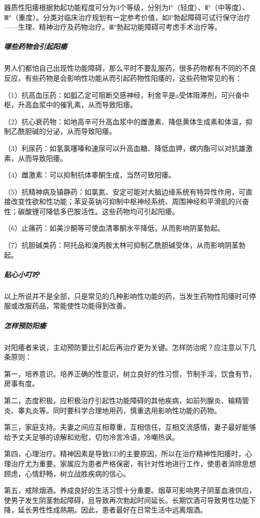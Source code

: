 \begin{enumerate}
器质性阳痿根据勃起功能程度可分为3个等级，分别为Ⅰ°（轻度）、Ⅱ°（中等度）、Ⅲ°（重度）。分类对临床治疗规划有一定参考价值，如Ⅰ°勃起障碍可试行保守治疗——生理、精神治疗及药物治疗。Ⅲ°勃起功能障碍可考虑手术治疗等。

\subparagraph{哪些药物会引起阳痿}

男人们都怕自己出现性功能障碍，那么平时不要乱服药，很多药物都有不同的不良反应，有些药物是会影响性功能从而引起药物性阳痿的，这些药物常见的有：

（1）抗高血压药：如胍乙定可阻断交感神经，利舍平是a受体阻滞剂，可兴奋中枢，升高血浆中的催乳素，从而导致阳痿。

（2）抗心衰药物：如地高辛可升高血浆中的雌激素、降低黄体生成素和体温，抑制乙酰胆碱的分泌，从而导致阳痿。

（3）利尿药：如氢氯噻嗪和速尿可以升高血糖、降低血钾，螺内酯可以对抗雄激素，从而导致阳痿。

（4）雌激素：可以抑制抗体睾酮生成，当然可致阳痿。

（5）抗精神病及镇静药：如氯氮、安定可能对大脑边缘系统有特异性作用，可直接改变性欲和性功能；苯妥英钠可抑制中枢神经系统、周围神经和平滑肌的兴奋性；碳酸锂可降低多巴胺活性。这些药物均可引起阳痿。

（6）止痛药：如美沙酮等可使血清睾酮水平降低，从而影响阴茎勃起。

（7）抗胆碱类药：阿托品和溴丙胺太林可抑制乙酰胆碱受体，从而影响阴茎勃起。

\subparagraph{贴心小叮咛}

以上所说并不是全部，只是常见的几种影响性功能的药，当发生药物性阳痿时可停服或改服药品，常能使性功能得到改善。

\subparagraph{怎样预防阳痿}

对阳痿者来说，主动预防要比引起后再治疗更为关键。怎样防治呢？应注意以下几条原则：

第一，培养意识。培养正确的性意识，树立良好的性习惯，节制手淫，饮食有节，房事有度。

第二，态度积极。应积极治疗引起性功能障碍的其他疾病，如前列腺炎、输精管炎、睾丸炎等。同时要科学合理地用药，慎重选用影响性功能的药物。

第三，家庭支持。夫妻之间应互相尊重，互相信任，互相交流感情，妻子最好能够给予丈夫足够的谅解和劝慰，切勿冷言冷语，冷嘲热讽。

第四，心理治疗。精神因素是导致ED的主要原因，所以在治疗精神性阳痿时，心理治疗尤为重要。家属应为患者严格保密，有针对性地进行工作，使患者消除思想顾虑，心情舒畅，树立战胜疾病的信心。

第五，戒除烟酒。养成良好的生活习惯十分重要。烟草可影响男子阴茎血液供应，使男子发生阴茎勃起障碍，且导致再次勃起时间延长。长期饮酒可导致男性功能下降，延长男性性成熟期。因此，患者最好在日常生活中远离烟酒。


\end{enumerate}
